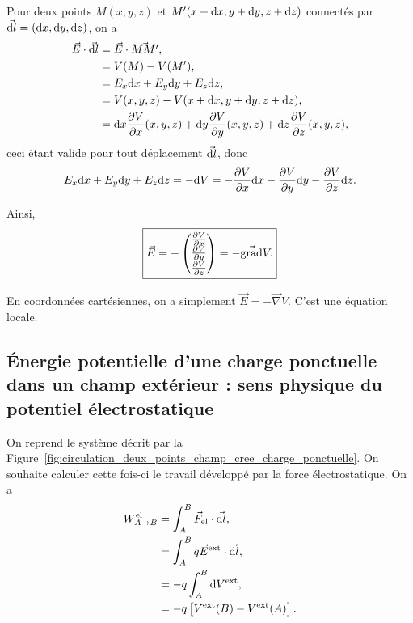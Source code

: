         Pour deux points $M(x,y,z)$ et $M'(x+\mathrm{d} x,y+\mathrm{d} y,z+\mathrm{d} z)$ connectés par $\vec{\mathrm{d} l}=(\mathrm{d} x,\mathrm{d} y, \mathrm{d} z)$, on a
        \begin{align*}
            \vec{E}\cdot\vec{\mathrm{d} l}
            &=
            \vec{E}\cdot\vec{MM'},\\
            &=
            V(M)-V(M'),\\
            &=
            E_x\mathrm{d} x+E_y\mathrm{d} y+E_z\mathrm{d} z,\\
            &=
            V(x,y,z)-V(x+\mathrm{d} x,y+\mathrm{d} y,z+\mathrm{d} z),\\
            &=\mathrm{d} x\frac{\partial V}{\partial x}(x,y,z)+\mathrm{d} y\frac{\partial V}{\partial y}(x,y,z)+\mathrm{d} z\frac{\partial V}{\partial z}(x,y,z),
        \end{align*}
        ceci étant valide pour tout déplacement $\vec{\mathrm{d} l}$, donc 
        \begin{equation*}
            E_x\mathrm{d} x+E_y\mathrm{d} y+E_z\mathrm{d} z=-\mathrm{d} V=-\frac{\partial V}{\partial x}\mathrm{d} x-\frac{\partial V}{\partial y}\mathrm{d} y-\frac{\partial V}{\partial z}\mathrm{d} z.
        \end{equation*}

        Ainsi, 
        \begin{equation*}
            \boxed{
                \vec{E}=-\begin{pmatrix}
                    \frac{\partial V}{\partial x}\\
                    \frac{\partial V}{\partial y}\\
                    \frac{\partial V}{\partial z}
                \end{pmatrix}
                =-\vec{\mathrm{grad}}V.
            }
        \end{equation*}

        En coordonnées cartésiennes, on a simplement $\vec{E}=-\vec{\nabla}V$. C'est une équation locale.

    \subsection{Énergie potentielle d'une charge ponctuelle dans un champ extérieur : sens physique du potentiel électrostatique}

        On reprend le système décrit par la Figure~\ref{fig:circulation_deux_points_champ_cree_charge_ponctuelle}. On souhaite calculer cette fois-ci le travail développé par la force électrostatique. On a 
        \begin{align*}
            W_{A\to B}^{\text{el}}
            &=
            \int_{A}^{B} \vec{F}_{\text{el}}\cdot\vec{\mathrm{d} l},\\
            &=
            \int_{A}^{B}q\vec{E}^{\text{ext}}\cdot\vec{\mathrm{d} l},\\
            &=
            -q\int_{A}^{B}\mathrm{d} V^{\text{ext}},\\
            &=
            -q\left[
                V^{\text{ext}}(B)-V^{\text{ext}}(A)
            \right].
        \end{align*}

